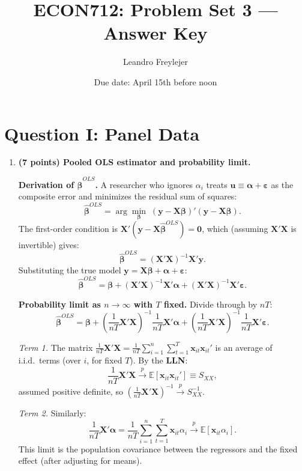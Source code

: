 \documentclass[letterpaper,12pt]{article}
\title{\vspace{-.5in} ECON712: Problem Set 3 --- Answer Key}
\author{Leandro Freylejer}
\date{Due date: April 15th before noon}
\begin{document}

\maketitle
\vspace{-.3in}

\section*{Question I: Panel Data}

\begin{enumerate}[label=(\alph*)]

\item \textbf{(7 points) Pooled OLS estimator and probability limit.}

\medskip
\textbf{Derivation of $\hat{\bm{\beta}}^{OLS}$.} A researcher who ignores $\alpha_i$ treats $\bm{u} \equiv \bm{\alpha} + \bm{\varepsilon}$ as the composite error and minimizes the residual sum of squares:
\[
\hat{\bm{\beta}}^{OLS} = \arg\min_{\bm{\beta}}\;(\bm{y}-\bm{X}\bm{\beta})'(\bm{y}-\bm{X}\bm{\beta}).
\]
The first-order condition is $\bm{X}'(\bm{y} - \bm{X}\hat{\bm{\beta}}^{OLS}) = \bm{0}$, which (assuming $\bm{X}'\bm{X}$ is invertible) gives:
\[
\boxed{\hat{\bm{\beta}}^{OLS} = (\bm{X}'\bm{X})^{-1}\bm{X}'\bm{y}.}
\]
Substituting the true model $\bm{y} = \bm{X}\bm{\beta} + \bm{\alpha} + \bm{\varepsilon}$:
\[
\hat{\bm{\beta}}^{OLS} = \bm{\beta} + (\bm{X}'\bm{X})^{-1}\bm{X}'\bm{\alpha} + (\bm{X}'\bm{X})^{-1}\bm{X}'\bm{\varepsilon}.
\]

\textbf{Probability limit as $n\to\infty$ with $T$ fixed.} Divide through by $nT$:
\[
\hat{\bm{\beta}}^{OLS} = \bm{\beta} + \left(\frac{1}{nT}\bm{X}'\bm{X}\right)^{-1}\!\frac{1}{nT}\bm{X}'\bm{\alpha} + \left(\frac{1}{nT}\bm{X}'\bm{X}\right)^{-1}\!\frac{1}{nT}\bm{X}'\bm{\varepsilon}.
\]

\textit{Term 1.} The matrix $\frac{1}{nT}\bm{X}'\bm{X} = \frac{1}{nT}\sum_{i=1}^n\sum_{t=1}^T \bm{x}_{it}\bm{x}_{it}'$ is an average of i.i.d.\ terms (over $i$, for fixed $T$). By the \textbf{LLN}:
\[
\frac{1}{nT}\bm{X}'\bm{X} \xrightarrow{p} \mathbb{E}[\bm{x}_{it}\bm{x}_{it}'] \equiv S_{XX},
\]
assumed positive definite, so $\left(\frac{1}{nT}\bm{X}'\bm{X}\right)^{-1} \xrightarrow{p} S_{XX}^{-1}$.

\textit{Term 2.} Similarly:
\[
\frac{1}{nT}\bm{X}'\bm{\alpha} = \frac{1}{nT}\sum_{i=1}^n\sum_{t=1}^T \bm{x}_{it}\alpha_i \xrightarrow{p} \mathbb{E}[\bm{x}_{it}\alpha_i].
\]
This limit is the population covariance between the regressors and the fixed effect (after adjusting for means).


\end{enumerate}
\end{document}
